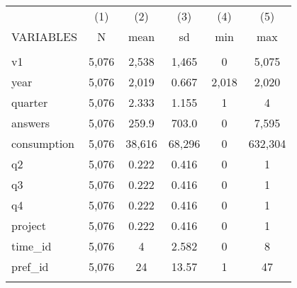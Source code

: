 \documentclass[]{article}
\begin{document}
\begin{tabular}{lccccc} \hline
 & (1) & (2) & (3) & (4) & (5) \\
VARIABLES & N & mean & sd & min & max \\ \hline
 &  &  &  &  &  \\
v1 & 5,076 & 2,538 & 1,465 & 0 & 5,075 \\
year & 5,076 & 2,019 & 0.667 & 2,018 & 2,020 \\
quarter & 5,076 & 2.333 & 1.155 & 1 & 4 \\
answers & 5,076 & 259.9 & 703.0 & 0 & 7,595 \\
consumption & 5,076 & 38,616 & 68,296 & 0 & 632,304 \\
q2 & 5,076 & 0.222 & 0.416 & 0 & 1 \\
q3 & 5,076 & 0.222 & 0.416 & 0 & 1 \\
q4 & 5,076 & 0.222 & 0.416 & 0 & 1 \\
project & 5,076 & 0.222 & 0.416 & 0 & 1 \\
time\_id & 5,076 & 4 & 2.582 & 0 & 8 \\
pref\_id & 5,076 & 24 & 13.57 & 1 & 47 \\
 &  &  &  &  &  \\ \hline
\end{tabular}
\end{document}
